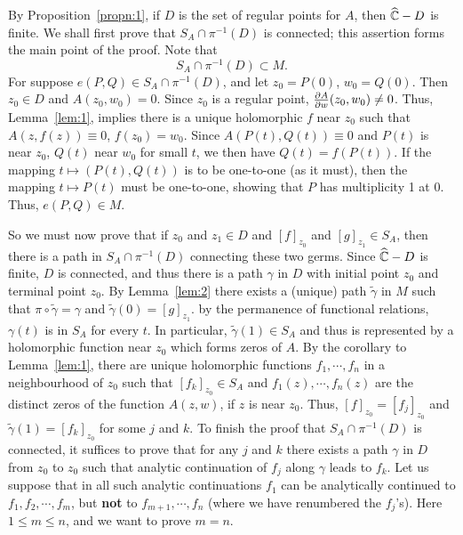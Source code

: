 \documentclass[a4paper,11pt]{article}
\begin{document}
\begin{myproof}
  By Proposition~\ref{propn:1}, if $D$ is the set of regular points
  for $A$, then $\widehat{{\mathbb C}}-D$ is finite.  We shall first prove
  that $S_A \cap \pi^{-1}(D)$ is connected; this assertion forms the
  main point of the proof.  Note that
  $$
  S_A \cap \pi^{-1}(D) \subset M.
  $$
  For suppose $e(P,Q) \in S_A \cap \pi^{-1}(D)$, and let $z_0 = P(0)$,
  $w_0 = Q(0)$.  Then $z_0 \in D$ and $A(z_0, w_0) = 0$.  Since $z_0$
  is a regular point, $\frac{\partial A}{\partial w}(z_0, w_0) \ne 0$.  Thus,
  Lemma~\ref{lem:1}, implies there is a unique holomorphic $f$ near
  $z_0$ such that
  $A(z,f(z)) \equiv 0$, $f(z_0) = w_0$.  Since $A(P(t), Q(t)) \equiv
  0$ and $P(t)$ is near $z_0$, $Q(t)$ near $w_0$ for small $t$, we
  then have $Q(t) = f(P(t))$.  If the mapping $t \mapsto (P(t), Q(t))$
  is to be one-to-one (as it must), then the mapping $t \mapsto P(t)$
  must be one-to-one, showing that $P$ has multiplicity 1 at 0.  Thus,
  $e(P,Q) \in M$.

  So we must now prove that if $z_0$ and $z_1 \in D$ and $[f]_{z_0}$
  and $[g]_{z_1} \in S_A$, then there is a path in $S_A \cap
  \pi^{-1}(D)$ connecting these two germs.  Since $\widehat{{\mathbb C}} - D$
  is finite, $D$ is connected, and thus there is a path $\gamma$ in
  $D$ with initial point $z_0$ and terminal point $z_0$.  By
  Lemma~\ref{lem:2} there exists a (unique) path $\widetilde{\gamma}$
  in $M$ such that $\pi \circ \widetilde{\gamma} = \gamma$ and
  $\widetilde{\gamma}(0) = [g]_{z_1}$.  by the permanence of
  functional relations, $\gamma(t)$ is in $S_A$ for every $t$.  In
  particular, $\widetilde{\gamma}(1) \in S_A$ and thus is represented
  by a holomorphic function near $z_0$ which forms zeros of $A$.  By
  the corollary to Lemma~\ref{lem:1}, there are unique holomorphic
  functions $f_1, \cdots, f_n$ in a neighbourhood of $z_0$ such that
  $[f_k]_{z_0} \in S_A$ and $f_1(z), \cdots, f_n(z)$ are the distinct
  zeros of the function $A(z,w)$, if $z$ is near $z_0$.  Thus,
  $[f]_{z_0} = [f_j]_{z_0}$ and $\widetilde{\gamma}(1) = [f_k]_{z_0}$
  for some $j$ and $k$.  To finish the proof that $S_A \cap
  \pi^{-1}(D)$ is connected, it suffices to prove that for any $j$ and
  $k$ there exists a path $\gamma$ in $D$ from $z_0$ to $z_0$ such
  that analytic continuation of $f_j$ along $\gamma$ leads to $f_k$.
  Let us suppose that in all such analytic continuations $f_1$ can be
  analytically continued to $f_1, f_2, \cdots, f_m$, but \textbf{not}
  to $f_{m+1}, \cdots, f_n$ (where we have renumbered the $f_j$'s).
  Here $1 \le m \le n$, and we want to prove $m=n$.


\end{myproof}
\end{document}
